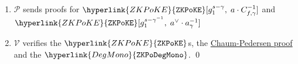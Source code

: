 \documentclass[11pt, lettersize, notitlepage, leqno, footskip=0.6cm]{article}
\newcommand{\mc}{\mathcal}
\newcommand{\mbf}{\mathbf}
\newcommand{\what}{\widehat}
\newcommand{\mP}{\mc{P}}
\newcommand{\V}{\mc{V}}
\newcommand{\vs}{\vspace{-0.15cm}}
\newcommand{\sta}{\stackrel{?}{=}}
\newcommand{\e}{\mbf{e}}
\numberwithin{equation}{section}
\begin{document}
\begin{mdframed}
\begin{enumerate}[wide, labelwidth=!, labelindent=0pt, itemsep=-0.2ex]

\item $\mP$ sends proofs for $\hyperlink{ZKPoKE}{\tt{ZKPoKE}}[g_1^{s-\gamma},\;a\cdot C_{f,\gamma}^{-1}]$ and $\hyperlink{ZKPoKE}{\tt{ZKPoKE}}[g_1^{s-\gamma^{-1}},\;a^{\vee}\cdot a_{\gamma}^{-1}]$

\item $\V$ verifies the $\hyperlink{ZKPoKE}{\tt{ZKPoKE}}$s, the \hyperlink{CP}{Chaum-Pedersen proof} and the $\hyperlink{DegMono}{\tt{ZKPoDegMono}}$. \qed \end{enumerate} \end{mdframed}


\begin{comment}\vs $$ \e(Q_{\gamma}\;,\;g_2^{s-\gamma})\sta \e(a\cdot C_{f,\gamma}^{-1}\;,\; g_2)\;\;,\;\; \e(\what{Q}_{\gamma}\;,\;g_2^{s-\gamma^{-1}})\sta \e(a^{\vee}\cdot a_{\gamma}^{-1}\;,\;g_2) \vs $$ \end{comment}




\bigskip
\end{document}
